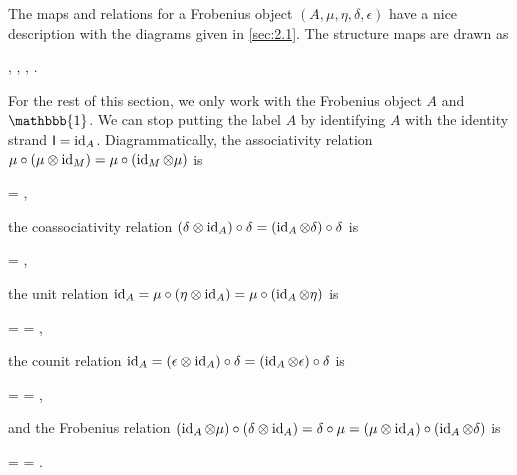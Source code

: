 The maps and relations for a Frobenius object $(A,\mu,\eta,\delta,\epsilon)$ have a nice description with the diagrams given in \autoref{sec:2.1}. The structure maps are drawn as
\begin{center}
    \quad , \quad
    \quad , \quad
    \quad , \quad
    .
\end{center}

For the rest of this section, we only work with the Frobenius object $A$ and $\mathbbb{1}$. We can stop putting the label $A$ by identifying $A$ with the identity strand $\mathsf{I} = \operatorname{id}_A$. Diagrammatically, the associativity relation $\mu \circ (\mu \otimes \operatorname{id}_M) = \mu \circ (\operatorname{id}_M \otimes \mu)$ is
\begin{center}
    =
    ,
\end{center}
the coassociativity relation $(\delta \otimes \operatorname{id}_A) \circ \delta = (\operatorname{id}_A \otimes \delta) \circ \delta$ is
\begin{center}
    =
    ,
\end{center}
the unit relation $\operatorname{id}_A = \mu \circ (\eta \otimes \operatorname{id}_A) = \mu \circ (\operatorname{id}_A \otimes \eta)$ is
\begin{center}
    =
    =
    ,
\end{center}
the counit relation $\operatorname{id}_A = (\epsilon \otimes \operatorname{id}_A) \circ \delta = (\operatorname{id}_A \otimes \epsilon) \circ \delta$ is
\begin{center}
    =
    =
    ,
\end{center}
and the Frobenius relation $(\operatorname{id}_A \otimes \mu) \circ (\delta \otimes \operatorname{id}_A) = \delta \circ \mu = (\mu \otimes \operatorname{id}_A) \circ (\operatorname{id}_A \otimes \delta)$ is
\begin{center}
    =
    =
    .
\end{center}


